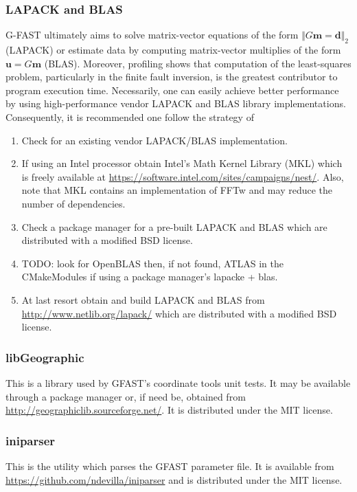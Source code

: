 \documentclass[12pt]{article}
\begin{document}
\subsubsection{LAPACK and BLAS} G-FAST ultimately aims to solve matrix-vector
equations of the form $\Vert G \textbf{m} = \textbf{d}\Vert_2 $ (LAPACK) or estimate 
data by computing matrix-vector multiplies of the form $\textbf{u} = G \textbf{m}$ (BLAS).  
Moreover, profiling shows that computation of the least-squares problem, particularly in the
finite fault inversion, is the greatest contributor to program execution time.  
Necessarily, one can easily achieve better performance
by using high-performance vendor LAPACK and BLAS library implementations.  
Consequently, it is recommended one follow the strategy of 
\begin{enumerate}
  \item Check for an existing vendor LAPACK/BLAS implementation.  
  \item If using an Intel processor obtain Intel's Math Kernel Library (MKL) 
        which is freely available at \url{https://software.intel.com/sites/campaigns/nest/}.
        Also, note that MKL contains an implementation of FFTw and may reduce the number of
        dependencies. 
  \item Check a package manager for a pre-built LAPACK and BLAS which are distributed with a
  modified BSD license.
  \item TODO: look for OpenBLAS then, if not found, ATLAS in the CMakeModules if using a 
  package manager's lapacke + blas.      
  \item At last resort obtain and build LAPACK and BLAS from \url{http://www.netlib.org/lapack/}
  which are distributed with a modified BSD license. 
\end{enumerate}

\subsubsection{libGeographic}
This is a library used by GFAST's coordinate tools unit tests.  It may be available through
a package manager or, if need be, obtained from \url{http://geographiclib.sourceforge.net/}.  It is
distributed under the MIT license. 

\subsubsection{iniparser}
This is the utility which parses the GFAST parameter file.  It is available from
\url{https://github.com/ndevilla/iniparser} and is distributed under the MIT license.
\end{document}
